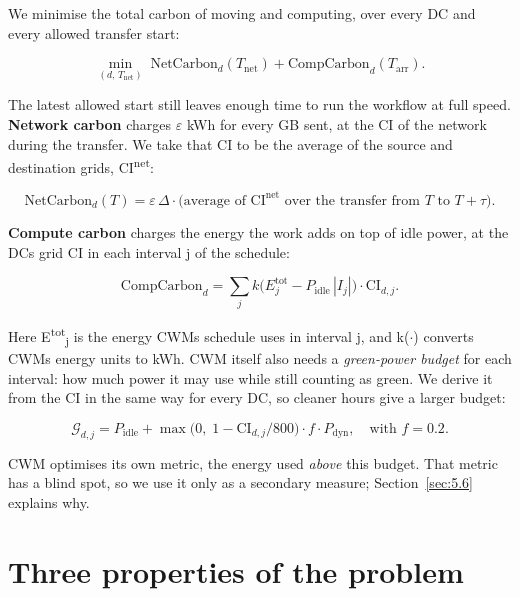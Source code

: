 \documentclass[12pt,a4paper,oneside,openany]{report}
\begin{document}
We minimise the total carbon of moving and computing, over every DC and
every allowed transfer start:

\begin{equation}
\min_{(d,\,T_{\mathrm{net}})} \; \mathrm{NetCarbon}_d(T_{\mathrm{net}}) + \mathrm{CompCarbon}_d(T_{\mathrm{arr}}).\label{eq:3.2}
\end{equation}

The latest allowed start still leaves enough time to run the workflow at
full speed. \textbf{Network carbon} charges \ensuremath{\varepsilon} kWh for every GB sent, at
the CI of the network during the transfer. We take that CI to be the
average of the source and destination grids, CI\textsuperscript{net}:

\begin{equation}
\mathrm{NetCarbon}_d(T) = \varepsilon\,\Delta \cdot \bigl(\text{average of } \mathrm{CI}^{\mathrm{net}} \text{ over the transfer from } T \text{ to } T+\tau\bigr).\label{eq:3.3}
\end{equation}

\textbf{Compute carbon} charges the energy the work adds on top of idle
power, at the DC\textquotesingle s grid CI in each interval j of the
schedule:

\begin{equation}
\mathrm{CompCarbon}_d = \sum_j k\bigl(E^{\mathrm{tot}}_j - P_{\mathrm{idle}}\,|I_j|\bigr) \cdot \mathrm{CI}_{d,j}.\label{eq:3.4}
\end{equation}

Here E\textsuperscript{tot}\textsubscript{j} is the energy
CWM\textquotesingle s schedule uses in interval j, and k(\ensuremath{\cdot}) converts
CWM\textquotesingle s energy units to kWh. CWM itself also needs a
\emph{green-power budget} for each interval: how much power it may use
while still counting as green. We derive it from the CI in the same way
for every DC, so cleaner hours give a larger budget:

\begin{equation}
\mathcal{G}_{d,j} = P_{\mathrm{idle}} + \max\bigl(0,\; 1 - \mathrm{CI}_{d,j}/800\bigr) \cdot f \cdot P_{\mathrm{dyn}}, \quad \text{with } f = 0.2.\label{eq:3.5}
\end{equation}

CWM optimises its own metric, the energy used \emph{above} this budget.
That metric has a blind spot, so we use it only as a secondary measure;
Section~\ref{sec:5.6} explains why.

\section{Three properties of the problem}\label{sec:3.3}
\end{document}
